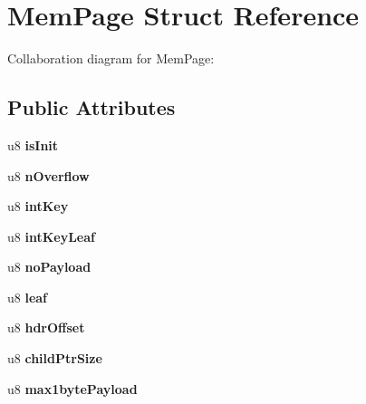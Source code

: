 \hypertarget{struct_mem_page}{\section{Mem\+Page Struct Reference}
\label{struct_mem_page}
}


Collaboration diagram for Mem\+Page\+:
\subsection*{Public Attributes}
\begin{DoxyCompactItemize}
\item 
\hypertarget{struct_mem_page_a3ab4ace46245be0fb2fb19eaa2862019}{u8 {\bfseries is\+Init}}\label{struct_mem_page_a3ab4ace46245be0fb2fb19eaa2862019}

\item 
\hypertarget{struct_mem_page_a3f7fa1a1eba3af840ef887e8ddd6d2cc}{u8 {\bfseries n\+Overflow}}\label{struct_mem_page_a3f7fa1a1eba3af840ef887e8ddd6d2cc}

\item 
\hypertarget{struct_mem_page_a46784c3c4708c7a582cff81a29c55323}{u8 {\bfseries int\+Key}}\label{struct_mem_page_a46784c3c4708c7a582cff81a29c55323}

\item 
\hypertarget{struct_mem_page_a7c30c56237c38e0b81842ae2a6bae9d7}{u8 {\bfseries int\+Key\+Leaf}}\label{struct_mem_page_a7c30c56237c38e0b81842ae2a6bae9d7}

\item 
\hypertarget{struct_mem_page_a2da94ed299adb77420de25b2208fa61b}{u8 {\bfseries no\+Payload}}\label{struct_mem_page_a2da94ed299adb77420de25b2208fa61b}

\item 
\hypertarget{struct_mem_page_af18504bd0a2e7d39d9b485d434af0447}{u8 {\bfseries leaf}}\label{struct_mem_page_af18504bd0a2e7d39d9b485d434af0447}

\item 
\hypertarget{struct_mem_page_a01967a1a593980fb71c8ccf3393ae156}{u8 {\bfseries hdr\+Offset}}\label{struct_mem_page_a01967a1a593980fb71c8ccf3393ae156}

\item 
\hypertarget{struct_mem_page_aeba10281fc255d9bbc0e31486f8fbd48}{u8 {\bfseries child\+Ptr\+Size}}\label{struct_mem_page_aeba10281fc255d9bbc0e31486f8fbd48}

\item 
\hypertarget{struct_mem_page_a79548547cafb0e6d8549006bdc553f0a}{u8 {\bfseries max1byte\+Payload}}\label{struct_mem_page_a79548547cafb0e6d8549006bdc553f0a}


\end{DoxyCompactItemize}
